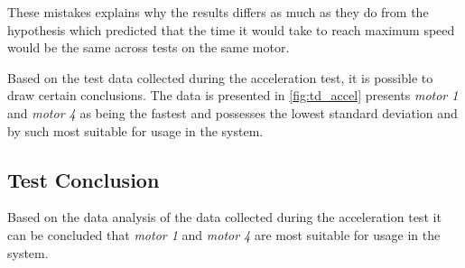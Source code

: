 These mistakes explains why the results differs as much as they do from the hypothesis which predicted that the time it would take to reach maximum speed would be the same across tests on the same motor.

Based on the test data collected during the acceleration test, it is possible to draw certain conclusions. The data is presented in \cref{fig:td_accel} presents \emph{motor 1} and \emph{motor 4} as being the fastest and possesses the lowest standard deviation and by such most suitable for usage in the system.

\subsection{Test Conclusion}
Based on the data analysis of the data collected during the acceleration test it can be concluded that \emph{motor 1} and \emph{motor 4} are most suitable for usage in the system.

